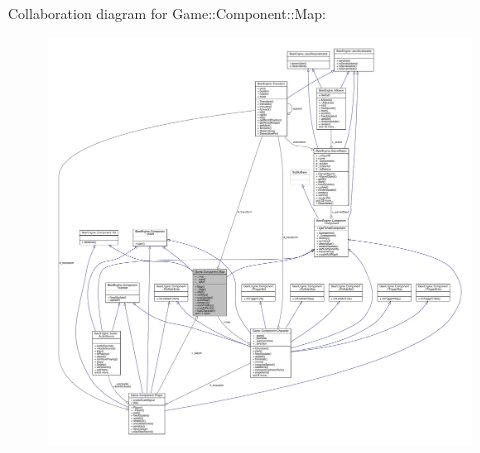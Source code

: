 Collaboration diagram for Game\+:\+:Component\+:\+:Map\+:\nopagebreak
\begin{figure}[H]
\begin{center}
\leavevmode
\includegraphics[width=350pt]{class_game_1_1_component_1_1_map__coll__graph}
\end{center}
\end{figure}
